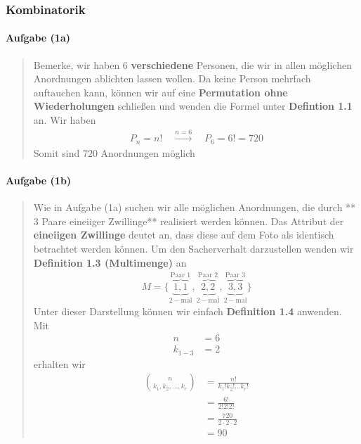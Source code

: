 \documentclass[
]{article}
\author{}
\date{}
\begin{document}
\subsubsection{Kombinatorik}\label{kombinatorik}

\paragraph{Aufgabe (1a)}\label{aufgabe-1a}

\begin{quote}
Bemerke, wir haben 6 \textbf{verschiedene} Personen, die wir in allen
möglichen Anordnungen ablichten lassen wollen. Da keine Person mehrfach
auftauchen kann, können wir auf eine \textbf{Permutation ohne
Wiederholungen} schließen und wenden die Formel unter \textbf{Defintion
1.1} an. Wir haben \[\begin{align}
P_{n}=n! \quad \overset{n=6}{\longrightarrow} \quad P_{6} = 6! = 720
\end{align}
\] Somit sind \(720\) Anordnungen möglich
\end{quote}

\paragraph{Aufgabe (1b)}\label{aufgabe-1b}

\begin{quote}
Wie in Aufgabe (1a) suchen wir alle möglichen Anordnungen, die durch **
3 Paare eineiiger Zwillinge** realisiert werden können. Das Attribut der
\textbf{eineiigen Zwillinge} deutet an, dass diese auf dem Foto als
identisch betrachtet werden können. Um den Sacherverhalt darzustellen
wenden wir \textbf{Definition 1.3 (Multimenge)} an \[\begin{align}
M = \{ \underbrace{\overbrace{1,1}}^{\text{Paar 1}}_{2-\text{mal}},\underbrace{\overbrace{2,2}}^{\text{Paar 2}}_{2-\text{mal}},\underbrace{\overbrace{3,3}}^{\text{Paar 3}}_{2-\text{mal}} \}
\end{align}\] Unter dieser Darstellung können wir einfach
\textbf{Definition 1.4} anwenden. Mit \[\begin{align}
n&=6 \\
k_{1-3} &= 2
\end{align}\] erhalten wir \[\begin{align}
\binom{n}{k_{1},k_{2}, \ldots, k_{r}}&= \frac{n!}{k_{1}!k_{2}!\dots k_{r}!} \\
&= \frac{6!}{2!2!2!} \\
&= \frac{720}{2 \cdot 2 \cdot 2} \\
&= 90
\end{align}\]
\end{quote}
\end{document}
